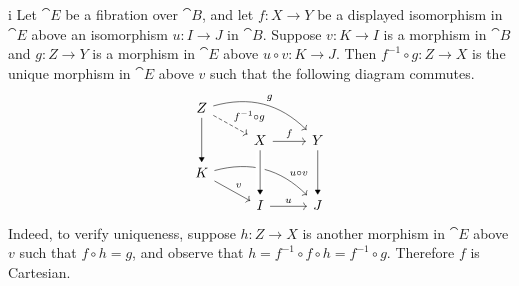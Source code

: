 \begin{partsolution}{i}
Let \(\cat{E}\) be a fibration over \(\cat{B}\), and let \(f : X \to Y\) be a displayed isomorphism in \(\cat{E}\) above an isomorphism \(u : I \to J\) in \(\cat{B}\).
Suppose \(v : K \to I\) is a morphism in \(\cat{B}\) and \(g : Z \to Y\) is a morphism in \(\cat{E}\) above \(u \circ v : K \to J\). Then \(f^{-1} \circ g : Z \to X\) is the unique morphism in \(\cat{E}\) above \(v\) such that the following diagram commutes.
\begin{equation*}
\begin{tikzcd}[row sep=small]
Z \arrow[rd, dashed, "f^{-1} \circ g"] \arrow[rrd, bend left, "g"] \arrow[dd, -Triangle] \\
& X \arrow[r, "f"] & Y \arrow[dd, -Triangle] \\
K \arrow[rd, "v"] \arrow[rrd, bend left, near end, "u \circ v"] \\
& I \arrow[r, "u"] & J
\arrow[from=uul, to=l, -Triangle, crossing over]
\end{tikzcd}
\end{equation*}
Indeed, to verify uniqueness, suppose \(h : Z \to X\) is another morphism in \(\cat{E}\) above \(v\) such that \(f \circ h = g\), and observe that \(h = f^{-1} \circ f \circ h = f^{-1} \circ g\).
Therefore \(f\) is Cartesian.
\end{partsolution}